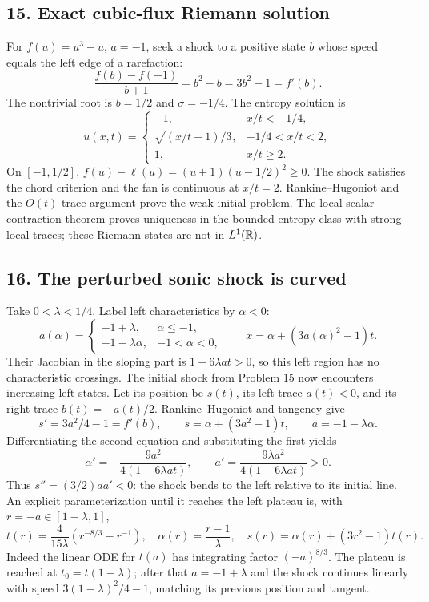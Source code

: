 \subsection*{15. Exact cubic-flux Riemann solution}
For $f(u)=u^3-u$, $a=-1$, seek a shock to a positive state $b$
whose speed equals the left edge of a rarefaction:
\[
 \frac{f(b)-f(-1)}{b+1}=b^2-b=3b^2-1=f'(b).
\]
The nontrivial root is $b=1/2$ and $\sigma=-1/4$.
The entropy solution is
\[
 u(x,t)=\begin{cases}
 -1,&x/t<-1/4,\\
 \sqrt{(x/t+1)/3},&-1/4<x/t<2,\\
 1,&x/t\ge2.
 \end{cases}
\]
On $[-1,1/2]$,
$f(u)-\ell(u)=(u+1)(u-1/2)^2\ge0$.
The shock satisfies the chord criterion and the fan is continuous
at $x/t=2$. Rankine--Hugoniot and the $O(t)$ trace argument prove
the weak initial problem. The local scalar contraction theorem
proves uniqueness in the bounded entropy class with strong local traces;
these Riemann states are not in $L^1(\mathbb{R})$.

\subsection*{16. The perturbed sonic shock is curved}
Take $0<\lambda<1/4$. Label left characteristics by $\alpha<0$:
\[
 a(\alpha)=\begin{cases}-1+\lambda,&\alpha\le-1,\\
 -1-\lambda\alpha,&-1<\alpha<0,
 \end{cases}\qquad
 x=\alpha+(3a(\alpha)^2-1)t.
\]
Their Jacobian in the sloping part is $1-6\lambda a t>0$, so this
left region has no characteristic crossings. The initial shock from
Problem 15 now encounters increasing left states. Let its position
be $s(t)$, its left trace $a(t)<0$, and its right trace
$b(t)=-a(t)/2$. Rankine--Hugoniot and tangency give
\begin{equation}\label{eq:11-sonic-shock}
 s'=3a^2/4-1=f'(b),\qquad
 s=\alpha+(3a^2-1)t,\qquad a=-1-\lambda\alpha.
\end{equation}
Differentiating the second equation and substituting the first yields
\[
 \alpha'=-\frac{9a^2}{4(1-6\lambda a t)},\qquad
 a'=\frac{9\lambda a^2}{4(1-6\lambda a t)}>0.
\]
Thus $s''=(3/2)aa'<0$: the shock bends to the left relative to
its initial line. An explicit parameterization until it reaches the
left plateau is, with $r=-a\in[1-\lambda,1]$,
\[
 t(r)=\frac4{15\lambda}(r^{-8/3}-r^{-1}),\quad
 \alpha(r)=\frac{r-1}\lambda,\quad
 s(r)=\alpha(r)+(3r^2-1)t(r).
\]
Indeed the linear ODE for $t(a)$ has integrating factor $(-a)^{8/3}$.
The plateau is reached at $t_0=t(1-\lambda)$; after that
$a=-1+\lambda$ and the shock continues linearly with speed
$3(1-\lambda)^2/4-1$, matching its previous position and tangent.

